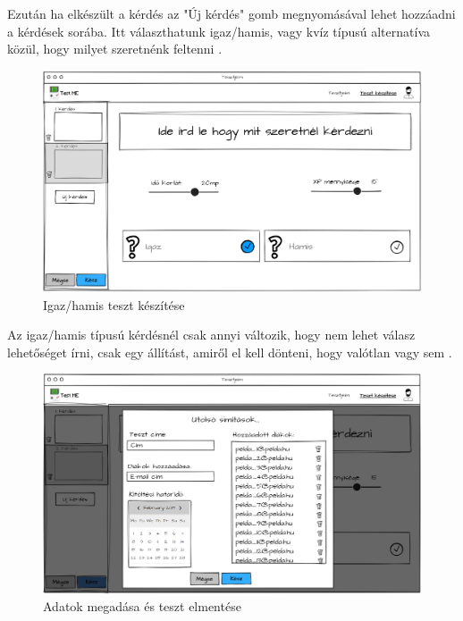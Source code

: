Ezután ha elkészült a kérdés az "Új kérdés" gomb megnyomásával lehet hozzáadni a kérdések sorába. Itt választhatunk igaz/hamis, vagy kvíz típusú alternatíva közül, hogy milyet szeretnénk feltenni .

\begin{figure}[H]
    \centering
    \includegraphics[width=\linewidth]{images/make_test3_wireframe.png}
    \caption{Igaz/hamis teszt készítése}
    \label{fig:test_true_false}
\end{figure}

Az igaz/hamis típusú kérdésnél csak annyi változik, hogy nem lehet válasz lehetőséget írni, csak egy állítást, amiről el kell dönteni, hogy valótlan vagy sem .

\begin{figure}[H]
    \centering
    \includegraphics[width=\linewidth]{images/make_test4_wireframe.png}
    \caption{Adatok megadása és teszt elmentése}
    \label{fig:save_test}
\end{figure}

